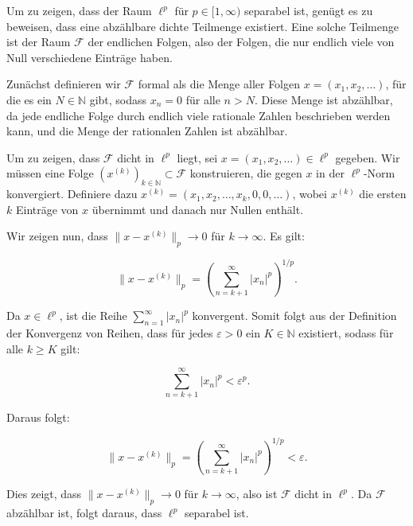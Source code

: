 Um zu zeigen, dass der Raum $\ell^p$ für $p \in [1, \infty)$ separabel ist, genügt es zu beweisen, dass eine abzählbare dichte Teilmenge existiert. Eine solche Teilmenge ist der Raum $\mathcal{F}$ der endlichen Folgen, also der Folgen, die nur endlich viele von Null verschiedene Einträge haben.

Zunächst definieren wir $\mathcal{F}$ formal als die Menge aller Folgen $x = (x_1, x_2, \ldots)$, für die es ein $N \in \mathbb{N}$ gibt, sodass $x_n = 0$ für alle $n > N$. Diese Menge ist abzählbar, da jede endliche Folge durch endlich viele rationale Zahlen beschrieben werden kann, und die Menge der rationalen Zahlen ist abzählbar.

Um zu zeigen, dass $\mathcal{F}$ dicht in $\ell^p$ liegt, sei $x = (x_1, x_2, \ldots) \in \ell^p$ gegeben. Wir müssen eine Folge $(x^{(k)})_{k \in \mathbb{N}} \subset \mathcal{F}$ konstruieren, die gegen $x$ in der $\ell^p$-Norm konvergiert. Definiere dazu $x^{(k)} = (x_1, x_2, \ldots, x_k, 0, 0, \ldots)$, wobei $x^{(k)}$ die ersten $k$ Einträge von $x$ übernimmt und danach nur Nullen enthält.

Wir zeigen nun, dass $\|x - x^{(k)}\|_p \to 0$ für $k \to \infty$. Es gilt:

\[
\|x - x^{(k)}\|_p = \left( \sum_{n=k+1}^{\infty} |x_n|^p \right)^{1/p}.
\]

Da $x \in \ell^p$, ist die Reihe $\sum_{n=1}^{\infty} |x_n|^p$ konvergent. Somit folgt aus der Definition der Konvergenz von Reihen, dass für jedes $\varepsilon > 0$ ein $K \in \mathbb{N}$ existiert, sodass für alle $k \geq K$ gilt:

\[
\sum_{n=k+1}^{\infty} |x_n|^p < \varepsilon^p.
\]

Daraus folgt:

\[
\|x - x^{(k)}\|_p = \left( \sum_{n=k+1}^{\infty} |x_n|^p \right)^{1/p} < \varepsilon.
\]

Dies zeigt, dass $\|x - x^{(k)}\|_p \to 0$ für $k \to \infty$, also ist $\mathcal{F}$ dicht in $\ell^p$. Da $\mathcal{F}$ abzählbar ist, folgt daraus, dass $\ell^p$ separabel ist.